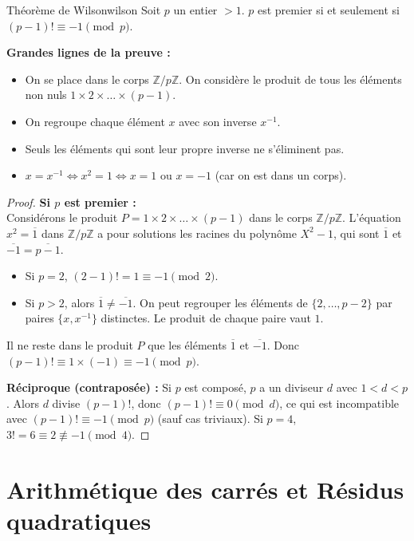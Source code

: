 \documentclass{prepacours}
\begin{document}
\begin{proposition}{Théorème de Wilson}{wilson}
    Soit $p$ un entier $> 1$.
    $p$ est premier si et seulement si $(p-1)! \equiv -1 \pmod p$.
\end{proposition}

\noindent \textbf{Grandes lignes de la preuve :}
\begin{itemize}
    \item On se place dans le corps $\mathbb{Z}/p\mathbb{Z}$. On considère le produit de tous les éléments non nuls $1 \times 2 \times \dots \times (p-1)$.
    \item On regroupe chaque élément $x$ avec son inverse $x^{-1}$.
    \item Seuls les éléments qui sont leur propre inverse ne s'éliminent pas.
    \item $x = x^{-1} \iff x^2 = 1 \iff x = 1$ ou $x = -1$ (car on est dans un corps).
\end{itemize}

\begin{proof}
    \textbf{Si $p$ est premier :} \\
    Considérons le produit $P = 1 \times 2 \times \dots \times (p-1)$ dans le corps $\mathbb{Z}/p\mathbb{Z}$.
    L'équation $x^2 = \overline{1}$ dans $\mathbb{Z}/p\mathbb{Z}$ a pour solutions les racines du polynôme $X^2 - 1$, qui sont $\overline{1}$ et $\overline{-1} = \overline{p-1}$.
    \begin{itemize}
        \item Si $p=2$, $(2-1)! = 1 \equiv -1 \pmod 2$.
        \item Si $p>2$, alors $\overline{1} \neq \overline{-1}$. On peut regrouper les éléments de $\{2, \dots, p-2\}$ par paires $\{x, x^{-1}\}$ distinctes. Le produit de chaque paire vaut $1$.
    \end{itemize}
    Il ne reste dans le produit $P$ que les éléments $\overline{1}$ et $\overline{-1}$.
    Donc $(p-1)! \equiv 1 \times (-1) \equiv -1 \pmod p$.
    
    \textbf{Réciproque (contraposée) :} Si $p$ est composé, $p$ a un diviseur $d$ avec $1 < d < p$. Alors $d$ divise $(p-1)!$, donc $(p-1)! \equiv 0 \pmod d$, ce qui est incompatible avec $(p-1)! \equiv -1 \pmod p$ (sauf cas triviaux). Si $p=4$, $3! = 6 \equiv 2 \not\equiv -1 \pmod 4$.
\end{proof}


\section{Arithmétique des carrés et Résidus quadratiques}
\end{document}
